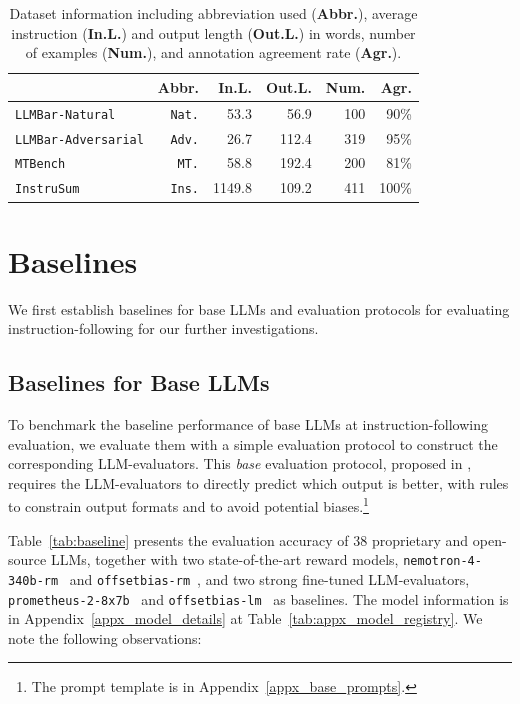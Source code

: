 \documentclass[11pt]{article}
\newcommand{\llmbarnatural}{\texttt{LLMBar-Natural}\xspace}
\newcommand{\adversarial}{\texttt{LLMBar-Adversarial}\xspace}
\newcommand{\mtbench}{\texttt{MTBench}\xspace}
\newcommand{\instrusum}{\texttt{InstruSum}\xspace}
\newcommand{\natshort}{\texttt{Nat.}\xspace}
\newcommand{\advshort}{\texttt{Adv.}\xspace}
\newcommand{\mtshort}{\texttt{MT.}\xspace}
\newcommand{\insshort}{\texttt{Ins.}\xspace}
\begin{document}
%
\renewcommand{\arraystretch}{1.1} 
\begin{table}[t!]
\small
\centering
\addtolength{\tabcolsep}{-4pt} 
\begin{tabular}{lrrrrr}
\toprule
 & \textbf{Abbr.} & \textbf{In.L.} & \textbf{Out.L.}  & \textbf{Num.} & \textbf{Agr.}\\
\midrule
\llmbarnatural & \natshort & 53.3 & 56.9 & 100 & 90\% \\
\adversarial & \advshort & 26.7 & 112.4 & 319 & 95\% \\
\mtbench & \mtshort & 58.8 & 192.4 & 200 & 81\% \\ 
\instrusum & \insshort & 1149.8 & 109.2 & 411 & 100\% \\ 
\bottomrule
\end{tabular}
\addtolength{\tabcolsep}{+4pt} 
\caption{Dataset information including abbreviation used (\textbf{Abbr.}), average instruction (\textbf{In.L.}) and output length (\textbf{Out.L.}) in words, number of examples (\textbf{Num.}), and annotation agreement rate (\textbf{Agr.}).
}
\label{tab:dataset-info} 
\end{table}

\section{Baselines}
\label{sec:status-quo}



% 
We first establish baselines for base LLMs and evaluation protocols for evaluating instruction-following for our further investigations.

\subsection{Baselines for Base LLMs}
\label{subsec:llm-baseline}
% 
To benchmark the baseline performance of base LLMs at instruction-following evaluation, we evaluate them with a simple evaluation protocol to construct the corresponding LLM-evaluators.
This \textit{base} evaluation protocol, proposed in \citet{zeng2024evaluating}, requires the LLM-evaluators to directly predict which output is better, with rules to constrain output formats and to avoid potential biases.\footnote{The prompt template is in Appendix~\ref{appx_base_prompts}.}

% 


Table~\ref{tab:baseline} presents the evaluation accuracy of 38 proprietary and open-source LLMs, together with two state-of-the-art reward models, \texttt{nemotron-4-340b-rm}~\citep{adler2024nemotron} and \texttt{offsetbias-rm}~\citep{park2024offsetbias}, and two strong fine-tuned LLM-evaluators, \texttt{prometheus-2-8x7b}~\cite{kim2024prometheus} and \texttt{offsetbias-lm}~\citep{park2024offsetbias} as baselines.
The model information is in Appendix~\ref{appx_model_details} at Table~\ref{tab:appx_model_registry}.
We note the following observations:
\end{document}
